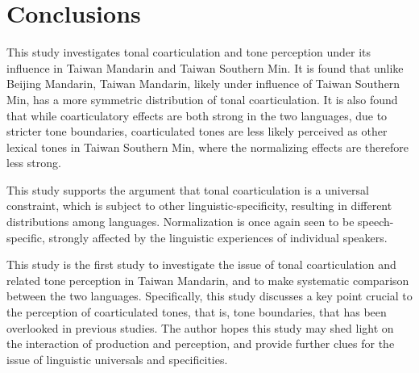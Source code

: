 
\chapter{Conclusions}\label{chapter:Conclusions}

This study investigates tonal coarticulation and tone perception under its influence in Taiwan Mandarin and Taiwan Southern Min. It is found that unlike Beijing Mandarin, Taiwan Mandarin, likely under influence of Taiwan Southern Min, has a more symmetric distribution of tonal coarticulation. It is also found that while coarticulatory effects are both strong in the two languages, due to stricter tone boundaries, coarticulated tones are less likely perceived as other lexical tones in Taiwan Southern Min, where the normalizing effects are therefore less strong.

This study supports the argument that tonal coarticulation is a universal constraint, which is subject to other linguistic-specificity, resulting in different distributions among languages. Normalization is once again seen to be speech-specific, strongly affected by the linguistic experiences of individual speakers.

This study is the first study to investigate the issue of tonal coarticulation and related tone perception in Taiwan Mandarin, and to make systematic comparison between the two languages. Specifically, this study discusses a key point crucial to the perception of coarticulated tones, that is, tone boundaries, that has been overlooked in previous studies. The author hopes this study may shed light on the interaction of production and perception, and provide further clues for the issue of linguistic universals and specificities. 
